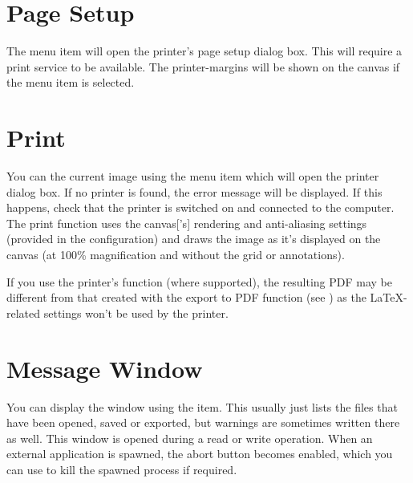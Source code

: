 \section{Page Setup}\label{sec:pagesetup}


The  menu item will open the printer's page
setup dialog box. This will require a print service to be available.
The \glspl{printer-margin} will be shown on the \gls{canvas} if the
 menu item is selected.

\section{Print}\label{sec:print}


You can  the current image using the  menu
item which will open the printer dialog box. If no printer is found,
the error message  will
be displayed. If this happens, check that the printer is switched
on and connected to the computer. The print function uses the
\gls{canvas}['s] \gls{rendering} and \gls{anti-aliasing} settings
(provided in the  configuration) and draws
the image as it's displayed on the \gls{canvas} (at 100\%
magnification and without the grid or annotations).

\begin{information}
If you use the printer's  function (where
supported), the resulting PDF may be different from that created
with the export to PDF function (see )
as the \LaTeX-related settings won't be used by the printer.
\end{information}

\section{Message Window}\label{sec:messages}


You can display the  window using the
 item. This usually just lists the
files that have been opened, saved or exported, but warnings are
sometimes written there as well. This window is opened during a read
or write operation. When an external application is spawned, the
abort button becomes enabled, which you can use to kill the spawned
process if required.

